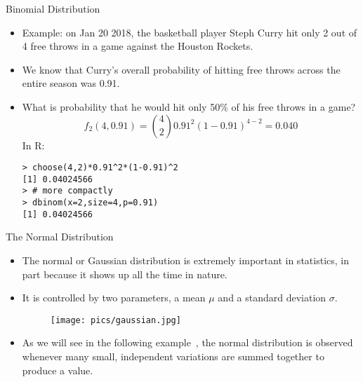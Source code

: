 \documentclass[handout]{beamer}
\begin{document}
 
\begin{frame}[fragile]{Binomial Distribution}

\scriptsize{
\begin{itemize}
\item Example: on Jan 20 2018, the basketball player Steph Curry hit only 2 out of 4 free throws in a game against the Houston Rockets.
\item We know that Curry's overall probability of hitting free throws across the entire season was 0.91.
\item What is probability that he would hit only 50\% of his free throws in a game?
\begin{displaymath}
 f_2(4,0.91) = {4 \choose 2}0.91^{2}(1-0.91)^{4-2}=0.040 
\end{displaymath}
In R: 
\begin{verbatim}
> choose(4,2)*0.91^2*(1-0.91)^2
[1] 0.04024566
> # more compactly
> dbinom(x=2,size=4,p=0.91)
[1] 0.04024566
\end{verbatim}
 
 \end{itemize}}
 
 \end{frame}


 

\begin{frame}{The Normal Distribution}

\scriptsize{
\begin{itemize}
 \item  The normal or Gaussian distribution is extremely important in statistics, in part because it shows up all the time in nature. 
 \item It is controlled by two parameters, a mean $\mu$ and a standard deviation $\sigma$. 
 
 \begin{figure}[h!]
	\centering
	\texttt{[image: pics/gaussian.jpg]}
\end{figure}
 
 \item As we will see in the following example~\cite{mcelreath2020statistical}, the normal distribution is observed whenever many small, independent variations are summed together to produce a value.
 \end{itemize}}
 
 
 \end{frame}
\end{document}

